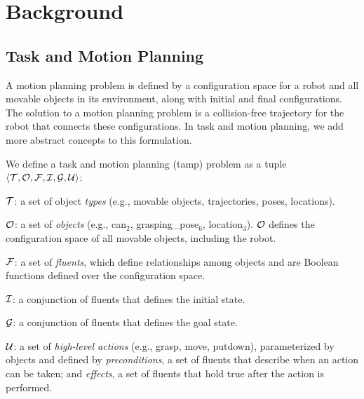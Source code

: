 \section{Background}
\subsection{Task and Motion Planning}

A motion planning problem is defined by a configuration space for a
robot and all movable objects in its environment, along with initial
and final configurations. The solution to a motion planning problem is
a collision-free trajectory for the robot that connects these
configurations.  In task and motion planning, we add more abstract
concepts to this formulation.


\begin{defn}
We define a task and motion planning ({\sc tamp}) problem as a tuple
$\langle \mathcal{T}, \mathcal{O}, \mathcal{F}, \mathcal{I}, \mathcal{G}, \mathcal{U} \rangle$:
\begin{tightlist}
\item $\mathcal{T}$: a set of object \emph{types} (e.g., movable objects,
  trajectories, poses, locations).

\item $\mathcal{O}$: a set of \emph{objects} (e.g., can$_{2}$, grasping\_pose$_{6}$, location$_{3}$).
  $\mathcal{O}$ defines the configuration space of all movable
  objects, including the robot.

\item $\mathcal{F}$: a set of \emph{fluents}, which define relationships among
  objects and are Boolean functions defined over the configuration
  space.

\item $\mathcal{I}$: a conjunction of fluents that defines the initial state.

\item $\mathcal{G}$: a conjunction of fluents that defines the goal state.

\item $\mathcal{U}$: a set of \emph{high-level actions} (e.g., grasp, move,
  putdown), parameterized by objects and defined by
  \emph{preconditions}, a set of fluents that describe when an action
  can be taken; and \emph{effects}, a set of fluents that hold true
  after the action is performed.
\end{tightlist}
\end{defn}

